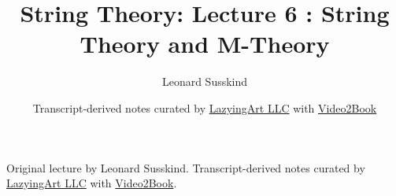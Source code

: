 \documentclass[11pt,oneside]{book}
\begin{document}
\frontmatter
\title{String Theory: Lecture 6 : String Theory and M-Theory}
\author{Leonard Susskind}
\date{Transcript-derived notes curated by \href{https://lazying.art}{LazyingArt LLC} with \href{https://github.com/lachlanchen/Video2Book}{Video2Book}}
\maketitle
\begin{center}
\small Original lecture by Leonard Susskind. Transcript-derived notes curated by \href{https://lazying.art}{LazyingArt LLC} with \href{https://github.com/lachlanchen/Video2Book}{Video2Book}.
\end{center}
\clearpage
\mainmatter

\end{document}
